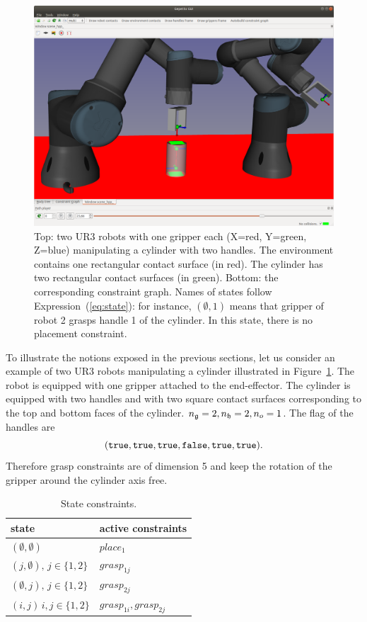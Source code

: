 \begin{figure}
  \begin{center}
    \includegraphics[width=\linewidth]{figures/example.png}
    \def\svgwidth{\columnwidth}
    \graphicspath{{./figures/}}
    
  \end{center}
  \caption{Top: two UR3 robots with one gripper each (X=red, Y=green, Z=blue) manipulating a cylinder with two handles. The environment contains one rectangular contact surface (in red). The cylinder has two rectangular contact surfaces (in green).
  Bottom: the corresponding constraint graph. Names of states follow Expression~(\ref{eq:state}): for instance, $(\emptyset,1)$ means that gripper of robot 2 grasps handle 1 of the cylinder. In this state, there is no placement constraint.}
  \label{fig:2ur3-cylinder}
\end{figure}
To illustrate the notions exposed in the previous sections, let us consider an example of two UR3 robots manipulating a cylinder illustrated in Figure~\ref{fig:2ur3-cylinder}. The robot is equipped with one gripper attached to the end-effector. The cylinder is equipped with two handles and with two square contact surfaces corresponding to the top and bottom faces of the cylinder. $n_{\mathfrak{g}}=2,n_{\mathfrak{h}}=2,n_{o}=1$. The flag of the handles are
$$(\texttt{true},\texttt{true},\texttt{true},\texttt{false},\texttt{true},\texttt{true}).$$
Therefore grasp constraints are of dimension 5 and keep the rotation of the gripper around the cylinder axis free.
\begin{table}
  \begin{center}
    \begin{tabular}{|p{.44\linewidth}|p{.44\linewidth}|}
      \hline
      state & active constraints\\
      \hline
      $(\emptyset,\emptyset)$ & $place_1$ \\
      $(j,\emptyset),\,j\in\{1,2\}$ & $grasp_{1j}$\\
      $(\emptyset,j),\,j\in\{1,2\}$ & $grasp_{2j}$\\
      $(i,j)\,i,j\in\{1,2\}$ & $grasp_{1i},grasp_{2j}$\\
      \hline
    \end{tabular}
  \end{center}
  \caption{State constraints.}
  \label{tab:state-constraints}
\end{table}
